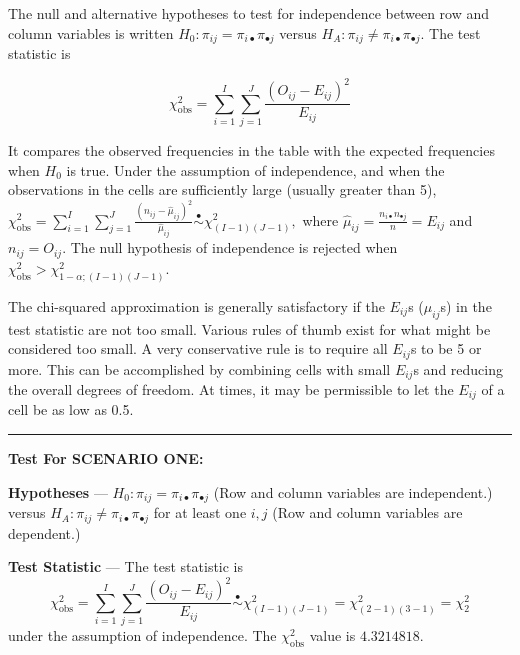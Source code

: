\documentclass[
]{article}
\newenvironment{Shaded}{\begin{snugshade}}{\end{snugshade}}
\newcommand{\FunctionTok}[1]{\textcolor[rgb]{0.00,0.00,0.00}{#1}}
\newcommand{\NormalTok}[1]{#1}
\newcommand{\SpecialCharTok}[1]{\textcolor[rgb]{0.00,0.00,0.00}{#1}}
\begin{document}
The null and alternative hypotheses to test for independence between row and column variables is written \(H_0: \pi_{ij}=\pi_{i\bullet}\pi_{\bullet j}\) versus \(H_A:\pi_{ij} \ne \pi_{i\bullet}\pi_{\bullet j}\). The test statistic is

\begin{equation}
\chi_{\text{obs}}^2 =\sum_{i=1}^I\sum_{j=1}^J \frac{(O_{ij} - E_{ij})^2}{E_{ij}}
\label{eq:ChiSqStatIndep}
\end{equation}

It compares the observed frequencies in the table with the expected frequencies when \(H_0\) is true. Under the assumption of independence, and when the observations in the cells are sufficiently large (usually greater than 5), \(\chi_{\text{obs}}^2 =\sum_{i=1}^{I}\sum_{j=1}^J \frac{(n_{ij}-\hat{\mu}_{ij})^2}{\hat{\mu}_{ij}} \overset{\bullet}{\sim} \chi^2_{(I-1)(J-1)},\) where \(\hat{\mu}_{ij}=\frac{n_{i\bullet}n_{\bullet j}}{n} = E_{ij}\) and \(n_{ij} = O_{ij}\). The null hypothesis of independence is rejected when \(\chi_{\text{obs}}^2 > \chi^2_{1-\alpha; (I-1)(J-1)}\).

The chi-squared approximation is generally satisfactory if the \(E_{ij}\)s (\(\hat{\mu}_{ij}\)s) in the test statistic are not too small. Various rules of thumb exist for what might be considered too small. A very conservative rule is to require all \(E_{ij}\)s to be 5 or more. This can be accomplished by combining cells with small \(E_{ij}\)s and reducing the overall degrees of freedom. At times, it may be permissible to let the \(E_{ij}\) of a cell be as low as 0.5.

\begin{center}\rule{0.5\linewidth}{0.5pt}\end{center}

\textbf{Test For SCENARIO ONE:}

\textbf{Hypotheses} --- \(H_0: \pi_{ij} = \pi_{i\bullet }\pi_{\bullet j}\)
(Row and column variables are independent.)
versus \(H_A: \pi_{ij} \ne \pi_{i\bullet }\pi_{\bullet j}\) for at least one \(i, j\)
(Row and column variables are dependent.)

\textbf{Test Statistic} --- The test statistic is
\[\chi_{\text{obs}}^2=\sum_{i=1}^I \sum_{j=1}^J 
        \frac{(O_{ij}-E_{ij})^2}{E_{ij}} \overset{\bullet}{\sim} \chi^2_{(I-1)(J-1)}=
        \chi^2_{(2-1)(3-1)}=\chi^2_2\]
under the assumption of independence. The \(\chi^2_{\text{obs}}\) value is
\(4.3214818\).

\begin{Shaded}
\end{Shaded}
\end{document}
